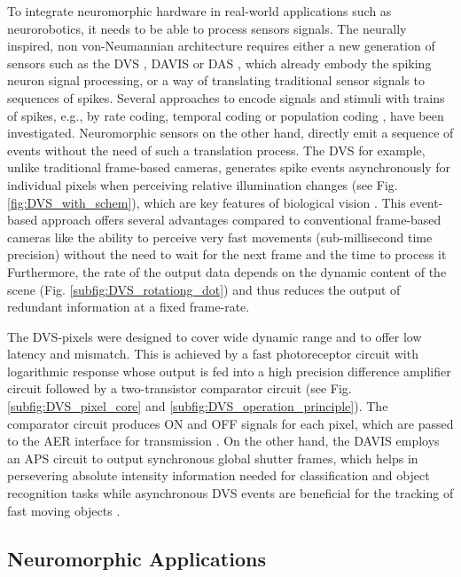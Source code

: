 To integrate neuromorphic hardware in real-world applications such as neurorobotics, it needs to be able to process sensors signals.
The neurally inspired, non von-Neumannian architecture requires either a new generation of sensors such as the \ac{DVS} \cite{Lichtsteiner2008}, \ac{DAVIS} \cite{Brandli2014} or \ac{DAS} \cite{Liu2014}, which already embody the spiking neuron signal processing, or a way of translating traditional sensor signals to sequences of spikes.
Several approaches to encode signals and stimuli with trains of spikes, e.g., by rate coding, temporal coding \cite[Chap. 7.6]{Gerstner2014} or population coding \cite[Chap. 1]{Gerstner2002}, \cite{Ponulak2011} have been investigated.
Neuromorphic sensors on the other hand, directly emit a sequence of events without the need of such a translation process.
The \ac{DVS} for example, unlike traditional frame-based cameras, generates spike events \cite{Lichtsteiner2008} asynchronously for individual pixels when perceiving relative illumination changes (see Fig. \ref{fig:DVS_with_schem}), which are key features of biological vision \cite{Lichtsteiner2008}.
This event-based approach offers several advantages compared to conventional frame-based cameras like the ability to perceive very fast movements (sub-millisecond time precision) without the need to wait for the next frame and the time to process it
Furthermore, the rate of the output data depends on the dynamic content of the scene (Fig. \ref{subfig:DVS_rotationg_dot}) and thus reduces the output of redundant information at a fixed frame-rate.

The \ac{DVS}-pixels were designed to cover wide dynamic range and to offer low latency and mismatch.
This is achieved by a fast photoreceptor circuit with logarithmic response whose output is fed into a high precision difference amplifier circuit followed by a two-transistor comparator circuit (see Fig. \ref{subfig:DVS_pixel_core} and \ref{subfig:DVS_operation_principle}).
The comparator circuit produces ON and OFF signals for each pixel, which are passed to the \ac{AER} interface for transmission \cite{Lichtsteiner2008}.
On the other hand, the \ac{DAVIS} employs an \ac{APS} circuit to output synchronous global shutter frames, which helps in persevering absolute intensity information needed for classification and object recognition tasks while asynchronous \ac{DVS} events are beneficial for the tracking of fast moving objects \cite{Brandli2014}.

\subsection{Neuromorphic Applications}
\label{subsec:neuro_applic}

